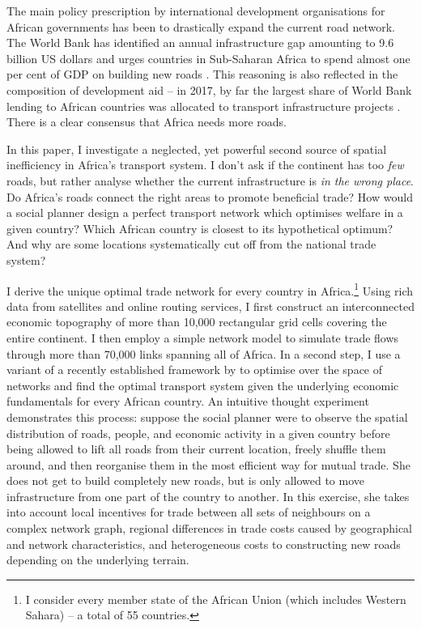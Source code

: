 \documentclass[11pt, oneside]{article}   	%
\begin{document}
The main policy prescription by international development organisations for African governments has been to drastically expand the current road network. The World Bank has identified an annual infrastructure gap amounting to 9.6 billion US dollars and urges countries in Sub-Saharan Africa to spend almost one per cent of GDP on building new roads \citep{Foster_AfricaInfrastructureTime_2010}. This reasoning is also reflected in the composition of development aid -- in 2017, by far the largest share of World Bank lending to African countries was allocated to transport infrastructure projects \citep{TheWorldBank_WorldBankAnnual_2017}. There is a clear consensus that Africa needs more roads.

In this paper, I investigate a neglected, yet powerful second source of spatial inefficiency in Africa's transport system. I don't ask if the continent has too \emph{few} roads, but rather analyse whether the current infrastructure is \emph{in the wrong place}. Do Africa's roads connect the right areas to promote beneficial trade? How would a social planner design a perfect transport network which optimises welfare in a given country? Which African country is closest to its hypothetical optimum? And why are some locations systematically cut off from the national trade system?

I derive the unique optimal trade network for every country in Africa.\footnote{I consider every member state of the African Union (which includes Western Sahara) -- a total of 55 countries.} Using rich data from satellites and online routing services, I first construct an interconnected economic topography of more than 10,000 rectangular grid cells covering the entire continent. I then employ a simple network model to simulate trade flows through more than 70,000 links spanning all of Africa. In a second step, I use a variant of a recently established framework by \cite{Fajgelbaum_OptimalTransportNetworks_2017} to optimise over the space of networks and find the optimal transport system given the underlying economic fundamentals for every African country. An intuitive thought experiment demonstrates this process: suppose the social planner were to observe the spatial distribution of roads, people, and economic activity in a given country before being allowed to lift all roads from their current location, freely shuffle them around, and then reorganise them in the most efficient way for mutual trade. She does not get to build completely new roads, but is only allowed to move infrastructure from one part of the country to another. In this exercise, she takes into account local incentives for trade between all sets of neighbours on a complex network graph, regional differences in trade costs caused by geographical and network characteristics, and heterogeneous costs to constructing new roads depending on the underlying terrain.
\end{document}
